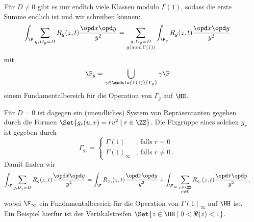 \begin{bewe}
Für $D \neq 0$ gibt es nur endlich viele Klassen modulo $\Gamma(1)$, sodass die erste Summe endlich ist und wir schreiben können:
\[
	\int_\F \sum_{g, D_g = D} R_g(z,t) \frac{\opd x \opd y}{y^2} = \sum_{\substack{g, D_g = D \\ g (\operatorname{mod} \Gamma(1))}} \int_{\F_g} R_g (z,t) \frac{\opd x \opd y}{y^2}
\]
mit 
\[
	\F_g = \bigcup_{\gamma \in \modulo {\Gamma(1)}{\Gamma_g}} \gamma \F
\]
einem Fundamentalbereich für die Operation von $\Gamma_g$ auf $\HH$.

Für $D = 0$ ist dagegen ein (unendliches) System von Repräsentanten gegeben durch die Formen $\Set {g_r(u,v) = rv^2 \mid r \in \ZZ }$. Die Fixgruppe eines solchen $g_r$ ist gegeben durch
\[
	\Gamma_{g_r} = \begin{cases} \Gamma(1) &\text{, falls } r = 0\\ \Gamma(1)_\infty &\text{, falls } r \neq 0 \,. \end{cases}
\]
Damit finden wir
\[
	\int_\F \sum_{g, D_g = D} R_g(z,t) \frac{\opd x \opd y}{y^2} = \int_\F R_{g_0} (z,t) \frac{\opd x \opd y}{y^2} + \int_{\F_\infty} \sum_{\substack{r \in \ZZ \\ r \neq 0}} R_{g_r}(z,t) \frac{\opd x \opd y}{y^2}
	\,,
\]
wobei $\F_\infty$ ein Fundamentalbereich für die Operation von $\Gamma(1)_\infty$ auf $\HH$ ist. Ein Beispiel hierfür ist der Vertikalstreifen $\Set {z \in \HH \mid 0 < \Re (z) < 1}$.

\end{bewe}
